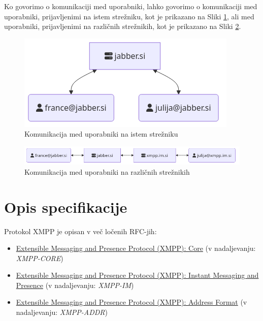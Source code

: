 \documentclass[11pt]{article}
\begin{document}
Ko govorimo o komunikaciji med uporabniki, lahko govorimo o
komunikaciji med uporabniki, prijavljenimi na istem strežniku, kot je
prikazano na Sliki \ref{fig:org8b57255}, ali med uporabniki, prijavljenimi
na različnih strežnikih, kot je prikazano na Sliki \ref{fig:org5018eae}.

\begin{figure}[H]
\centering
\includegraphics[width=.9\linewidth]{images/local-server.png}
\caption{\label{fig:org8b57255}Komunikacija med uporabniki na istem strežniku}
\end{figure}

\begin{figure}[H]
\centering
\includegraphics[width=.9\linewidth]{images/cross-server.png}
\caption{\label{fig:org5018eae}Komunikacija med uporabniki na različnih strežnikih}
\end{figure}

\section{Opis specifikacije}
\label{sec:orgf50d394}

Protokol XMPP je opisan v več ločenih RFC-jih:

\begin{itemize}
\item \href{https://datatracker.ietf.org/doc/rfc6120/}{Extensible Messaging and Presence Protocol (XMPP): Core} (v
nadaljevanju: \emph{XMPP-CORE})
\item \href{https://datatracker.ietf.org/doc/rfc6121/}{Extensible Messaging
and Presence Protocol (XMPP): Instant Messaging and Presence} (v
nadaljevanju: \emph{XMPP-IM})
\item \href{https://datatracker.ietf.org/doc/rfc7622/}{Extensible Messaging and Presence Protocol (XMPP): Address Format} (v
nadaljevanju: \emph{XMPP-ADDR})
\end{itemize}
\end{document}
